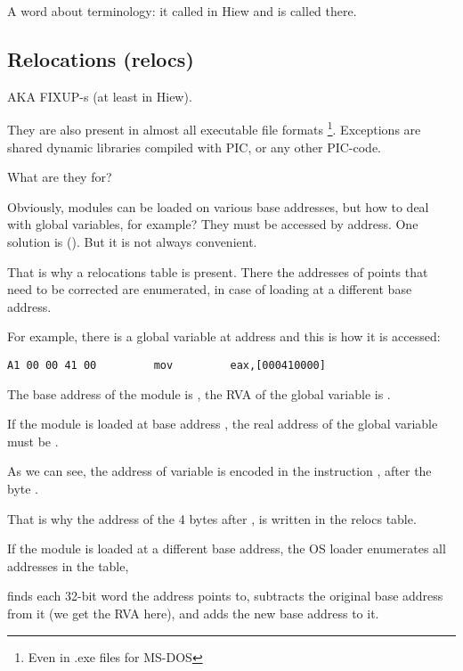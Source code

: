 A word about terminology:  it called  in Hiew
and  is called  there.

\subsection{Relocations (relocs)}
\label{subsec:relocs}

\ac{AKA} FIXUP-s (at least in Hiew).

They are also present in almost all executable file formats
\footnote{Even in .exe files for MS-DOS}.
Exceptions are shared dynamic libraries compiled with \ac{PIC}, or any other \ac{PIC}-code.

What are they for?

Obviously, modules can be loaded on various base addresses, but how to deal with global variables, for example?
They must be accessed by address.  One solution is \PICcode{} ().
But it is not always convenient.

That is why a relocations table is present.
There the addresses of points that need to be corrected are enumerated, 
in case of loading at a different base address.

For example, there is a global variable at address  and this is how it is accessed:

\begin{lstlisting}
A1 00 00 41 00         mov         eax,[000410000]
\end{lstlisting}

The base address of the module is , the \ac{RVA} of the global variable is .

If the module is loaded at base address , the real address of the global variable must be .


As we can see, the address of variable is encoded in the instruction , after the byte .

That is why the address of the 4 bytes after , is written in the relocs table.

If the module is loaded at a different base address, the \ac{OS} loader enumerates all addresses in the table, 

finds each 32-bit word the address points to, subtracts the original base address from it
(we get the \ac{RVA} here), and adds the new base address to it.

